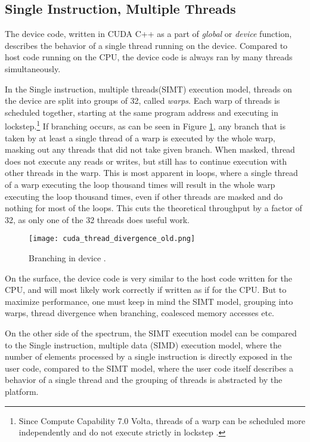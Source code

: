 \subsection{Single Instruction, Multiple Threads}
\label{sec:simt}

The device code, written in CUDA C++ as a part of \textit{global} or \textit{device} function, describes the behavior of a single thread running on the device. Compared to host code running on the CPU, the device code is always ran by many threads simultaneously.



In the Single instruction, multiple threads(SIMT) execution model, threads on the device are split into groups of 32, called \textit{warps}. Each warp of threads is scheduled together, starting at the same program address and executing in lockstep.\footnote{Since Compute Capability 7.0 Volta, threads of a warp can be scheduled more independently and do not execute strictly in lockstep \citep{paper:volta}.}
If branching occurs, as can be seen in Figure \ref{fig:thread_divergence_old}, any branch that is taken by at least a single thread of a warp is executed by the whole warp, masking out any threads that did not take given branch. When masked, thread does not execute any reads or writes, but still has to continue execution with other threads in the warp. This is most apparent in loops, where a single thread of a warp executing the loop thousand times will result in the whole warp executing the loop thousand times, even if other threads are masked and do nothing for most of the loops. This cuts the theoretical throughput by a factor of 32, as only one of the 32 threads does useful work.

\begin{figure}[ht]
	\centering
	\texttt{[image: cuda\_thread\_divergence\_old.png]}
	\caption{Branching in device \citep{site:cuda}.}
	\label{fig:thread_divergence_old}
\end{figure}


On the surface, the device code is very similar to the host code written for the CPU, and will most likely work correctly if written as if for the CPU. But to maximize performance, one must keep in mind the SIMT model, grouping into warps, thread divergence when branching, coalesced memory accesses etc.

On the other side of the spectrum, the SIMT execution model can be compared to the Single instruction, multiple data (SIMD) execution model, where the number of elements processed by a single instruction is directly exposed in the user code, compared to the SIMT model, where the user code itself describes a behavior of a single thread and the grouping of threads is abstracted by the platform. 

